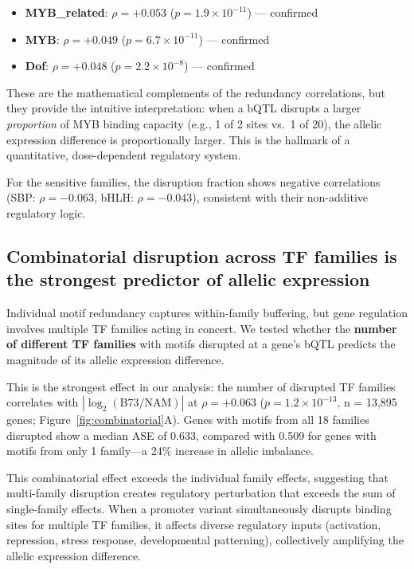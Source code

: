 \documentclass[11pt,a4paper]{article}
\begin{document}
\begin{itemize}
    \item \textbf{MYB\_related}: $\rho = +0.053$ ($p = 1.9 \times 10^{-11}$) --- confirmed
    \item \textbf{MYB}: $\rho = +0.049$ ($p = 6.7 \times 10^{-11}$) --- confirmed
    \item \textbf{Dof}: $\rho = +0.048$ ($p = 2.2 \times 10^{-8}$) --- confirmed
\end{itemize}

These are the mathematical complements of the redundancy correlations, but they provide the intuitive interpretation: when a bQTL disrupts a larger \textit{proportion} of MYB binding capacity (e.g., 1 of 2 sites vs.\ 1 of 20), the allelic expression difference is proportionally larger. This is the hallmark of a quantitative, dose-dependent regulatory system.

For the sensitive families, the disruption fraction shows negative correlations (SBP: $\rho = -0.063$, bHLH: $\rho = -0.043$), consistent with their non-additive regulatory logic.

\subsection{Combinatorial disruption across TF families is the strongest predictor of allelic expression}

Individual motif redundancy captures within-family buffering, but gene regulation involves multiple TF families acting in concert. We tested whether the \textbf{number of different TF families} with motifs disrupted at a gene's bQTL predicts the magnitude of its allelic expression difference.

This is the strongest effect in our analysis: the number of disrupted TF families correlates with $|\log_2(\text{B73/NAM})|$ at $\rho = +0.063$ ($p = 1.2 \times 10^{-13}$, n = 13,895 genes; Figure~\ref{fig:combinatorial}A). Genes with motifs from all 18 families disrupted show a median ASE of 0.633, compared with 0.509 for genes with motifs from only 1 family---a 24\% increase in allelic imbalance.

This combinatorial effect exceeds the individual family effects, suggesting that multi-family disruption creates regulatory perturbation that exceeds the sum of single-family effects. When a promoter variant simultaneously disrupts binding sites for multiple TF families, it affects diverse regulatory inputs (activation, repression, stress response, developmental patterning), collectively amplifying the allelic expression difference.
\end{document}
